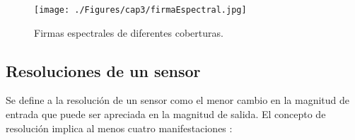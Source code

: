 \begin{figure}[H]
	\centering
	\texttt{[image: ./Figures/cap3/firmaEspectral.jpg]}
	\caption{Firmas espectrales de diferentes coberturas.}
	\label{fig:firmaEspectral}
\end{figure}

\subsection{Resoluciones de un sensor}

Se define a la resoluci\'on de un sensor como el menor cambio en la magnitud de entrada que puede ser apreciada en la magnitud de salida. El concepto de resoluci\'on implica al menos cuatro manifestaciones \cite{peralta2013analisis}: 
	\begin{itemize}
		

\end{itemize}
